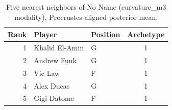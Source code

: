\begin{table}[htbp]
  \centering\small
  \begin{tabular}{rllc}
    \toprule
    Rank & Player & Position & Archetype \\
    \midrule
    1 & Khalid El-Amin & G & 1 \\
    2 & Andrew Funk & G & 1 \\
    3 & Vic Law & F & 1 \\
    4 & Alex Ducas & G & 1 \\
    5 & Gigi Datome & F & 1 \\
    \bottomrule
  \end{tabular}
  \caption{Five nearest neighbors of No Name (curvature_m3 modality), Procrustes-aligned posterior mean.}
  \label{tab:No_Name_neighbors_curvature_m3}
\end{table}

